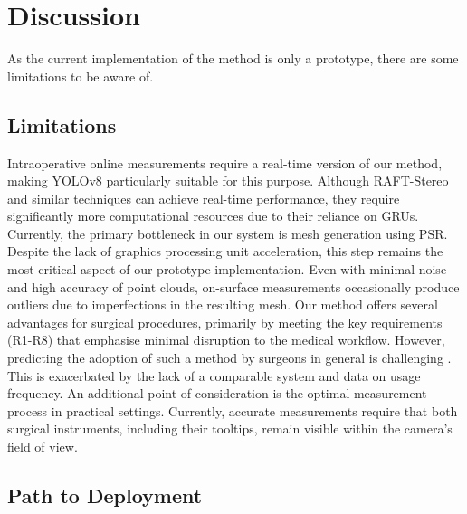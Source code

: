 \documentclass[letterpaper]{article} %
\begin{document}
\section{Discussion}
\label{sec:Discussion}

As the current implementation of the method is only a prototype, there are some limitations to be aware of.

\subsection{Limitations}

Intraoperative online measurements require a real-time version of our method, making YOLOv8 particularly suitable for this purpose. Although RAFT-Stereo and similar techniques can achieve real-time performance, they require significantly more computational resources due to their reliance on GRUs. Currently, the primary bottleneck in our system is mesh generation using PSR. Despite the lack of graphics processing unit acceleration, this step remains the most critical aspect of our prototype implementation. Even with minimal noise and high accuracy of point clouds, on-surface measurements occasionally produce outliers due to imperfections in the resulting mesh. Our method offers several advantages for surgical procedures, primarily by meeting the key requirements (R1-R8) that emphasise minimal disruption to the medical workflow. However, predicting the adoption of such a method by surgeons in general is challenging \cite{hemmer2022factors}. This is exacerbated by the lack of a comparable system and data on usage frequency. An additional point of consideration is the optimal measurement process in practical settings. Currently, accurate measurements require that both surgical instruments, including their tooltips, remain visible within the camera's field of view.

\subsection{Path to Deployment}
\end{document}
